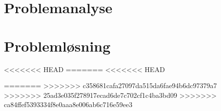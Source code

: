 


\part{Problemanalyse} 






\part{Problemløsning}







<<<<<<< HEAD
=======
<<<<<<< HEAD

=======
>>>>>>> c358681cafa27097da515da6fae94b6dc97379a7
>>>>>>> 25ad3e035f278917ecad6de7c702cf1c4ba3bd09
>>>>>>> ca84ffef5393334f8e0aaa8e006ab6c716e59ee3


